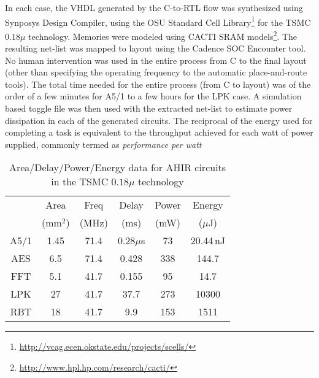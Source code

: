 \documentclass[conference]{IEEEtran}
\begin{document}
In each case, the VHDL generated by the C-to-RTL flow was synthesized
using Synposys Design Compiler, using the OSU Standard Cell
Library\footnote{\url{http://vcag.ecen.okstate.edu/projects/scells/}}
for the TSMC $0.18\mu$ technology. Memories were modeled using CACTI
SRAM
models\cite{CACTI}\footnote{\url{http://www.hpl.hp.com/research/cacti/}}.
The resulting net-list was mapped to layout using the Cadence SOC
Encounter tool. No human intervention was used in the entire process
from C to the final layout (other than specifying the operating
frequency to the automatic place-and-route tools). The total time
needed for the entire process (from C to layout) was of the order of a
few minutes for A5/1 to a few hours for the LPK case. A simulation
based toggle file was then used with the extracted net-list to
estimate power dissipation in each of the generated circuits. The
reciprocal of the energy used for completing a task is equivalent to
the throughput achieved for each watt of power supplied, commonly
termed as {\em performance per watt}

\begin{table}[htb]
  \centering
  \caption{Area/Delay/Power/Energy data for AHIR circuits in the TSMC $0.18\mu$ technology}
  \label{table:tsmc-180nm-data}
  \renewcommand\arraystretch{1.2}
  \setlength{\tabcolsep}{1ex}
  \begin{tabular}{c|c|c|c|c|c}
    \hline
    & Area & Freq & Delay & Power & Energy \\
    & (mm$^2$) & (MHz) & (ms) & (mW) & ($\mu$J) \\
    \hline
    \hline
    A5/1 & 1.45 & 71.4 & 0.28$\mu$s & 73 & 20.44\,nJ \\
    \hline
    AES & 6.5 & 71.4 & 0.428 & 338 & 144.7 \\
    \hline
    FFT & 5.1 & 41.7 & 0.155  & 95 & 14.7  \\
    \hline
    LPK & 27 & 41.7 & 37.7 & 273 & 10300  \\
    \hline
    RBT & 18 & 41.7 & 9.9 & 153 & 1511 \\
    \hline
  \end{tabular}

\end{table}
\end{document}
